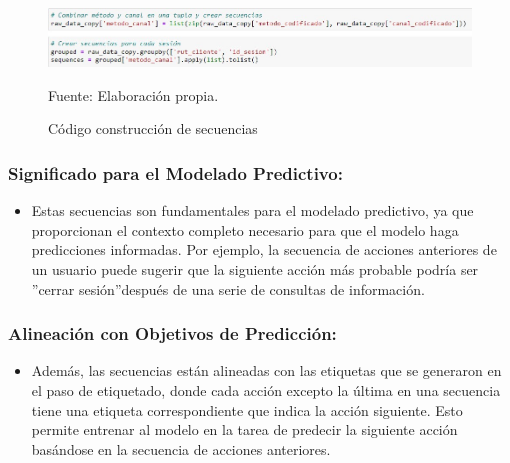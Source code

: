 \begin{figure}[H]
    \begin{minipage}[t]{0.9\textwidth}
        \caption{Código construcción de secuencias}
        \label{construcción_secuencias}        
    \end{minipage}

    \vspace{10pt}

    \begin{minipage}[b]{1\textwidth}
        \centering
        \includegraphics[width=\textwidth]{img/Código construcción de secuencias.jpg}        
    \end{minipage}

    \begin{minipage}[t]{0.9\textwidth}
        Fuente: Elaboración propia.
    \end{minipage}
\end{figure}

\subsubsection{Significado para el Modelado Predictivo:}

\begin{itemize}
    \item Estas secuencias son fundamentales para el modelado predictivo, ya que proporcionan el contexto completo necesario para que el modelo haga predicciones informadas. Por ejemplo, la secuencia de acciones anteriores de un usuario puede sugerir que la siguiente acción más probable podría ser \textquotedblright cerrar sesión\textquotedblright después de una serie de consultas de información.
\end{itemize}

\subsubsection{Alineación con Objetivos de Predicción:}

\begin{itemize}
    \item Además, las secuencias están alineadas con las etiquetas que se generaron en el paso de etiquetado, donde cada acción excepto la última en una secuencia tiene una etiqueta correspondiente que indica la acción siguiente. Esto permite entrenar al modelo en la tarea de predecir la siguiente acción basándose en la secuencia de acciones anteriores.
\end{itemize}

